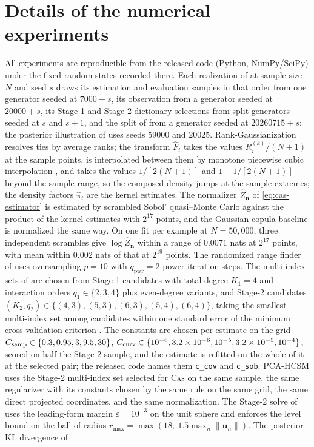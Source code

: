 \documentclass[review,hidelinks,onefignum,onetabnum]{siamart251216}
\newcommand{\vn}{\bm{n}}
\newcommand{\vu}{\bm{u}}
\begin{document}

\section{Details of the numerical experiments}
\label{app:protocol}

All experiments are reproducible from the released code (Python, NumPy/SciPy) under the fixed random states recorded there. Each realization of  at sample size $N$ and seed $s$ draws its estimation and evaluation samples in that order from one generator seeded at $7000 + s$, its observation from a generator seeded at $20000 + s$, its Stage-1 and Stage-2 dictionary selections from split generators seeded at $s$ and $s + 1$, and the split of  from a generator seeded at $20260715 + s$; the posterior illustration of  uses seeds $59000$ and $20025$. Rank-Gaussianization resolves ties by average ranks; the transform $\widehat F_i$ takes the values $R_i^{(k)}/(N+1)$ at the sample points, is interpolated between them by monotone piecewise cubic interpolation \cite{FritschCarlson1980}, and takes the values $1/[2(N+1)]$ and $1 - 1/[2(N+1)]$ beyond the sample range, so the composed density jumps at the sample extremes; the density factors $\widehat\pi_i$ are the kernel estimates. The normalizer $\widehat Z_{\vn}$ of \eqref{eq:cas-estimator} is estimated by scrambled Sobol' quasi--Monte Carlo \cite{Sobol1967, Owen1995} against the product of the kernel estimates with $2^{17}$ points, and the Gaussian-copula baseline is normalized the same way. On one fit per example at $N = 50{,}000$, three independent scrambles give $\log\widehat Z_{\vn}$ within a range of $0.0071$ nats at $2^{17}$ points, with mean within $0.002$ nats of that at $2^{19}$ points. The randomized range finder \cite{HalkoMartinssonTropp2011} of  uses oversampling $p = 10$ with $q_{\text{pwr}} = 2$ power-iteration steps. The multi-index sets of  are chosen from Stage-1 candidates with total degree $K_1 = 4$ and interaction orders $q_1 \in \{2, 3, 4\}$ plus even-degree variants, and Stage-2 candidates $(K_2, q_2) \in \{(4,3), (5,3), (6,3), (5,4), (6,4)\}$, taking the smallest multi-index set among candidates within one standard error of the minimum cross-validation criterion \cite[\S 7.10]{HastieTibshiraniFriedman2009}. The constants are chosen per estimate on the grid $C_{\rm samp} \in \{0.3, 0.95, 3, 9.5, 30\}$, $C_{\rm curv} \in \{10^{-6}, 3.2\times10^{-6}, 10^{-5}, 3.2\times10^{-5}, 10^{-4}\}$, scored on half the Stage-2 sample, and the estimate is refitted on the whole of it at the selected pair; the released code names them \texttt{c\_cov} and \texttt{c\_sob}. PCA-HCSM uses the Stage-2 multi-index set selected for \textsc{Cas} on the same sample, the same regularizer with its constants chosen by the same rule on the same grid, the same direct projected coordinates, and the same normalization. The Stage-2 solve of  uses the leading-form margin $\varepsilon = 10^{-3}$ on the unit sphere and enforces the level bound on the ball of radius $r_{\max} = \max(18,\ 1.5\max_n\|\vu_n\|)$. The posterior KL divergence of 
\end{document}
